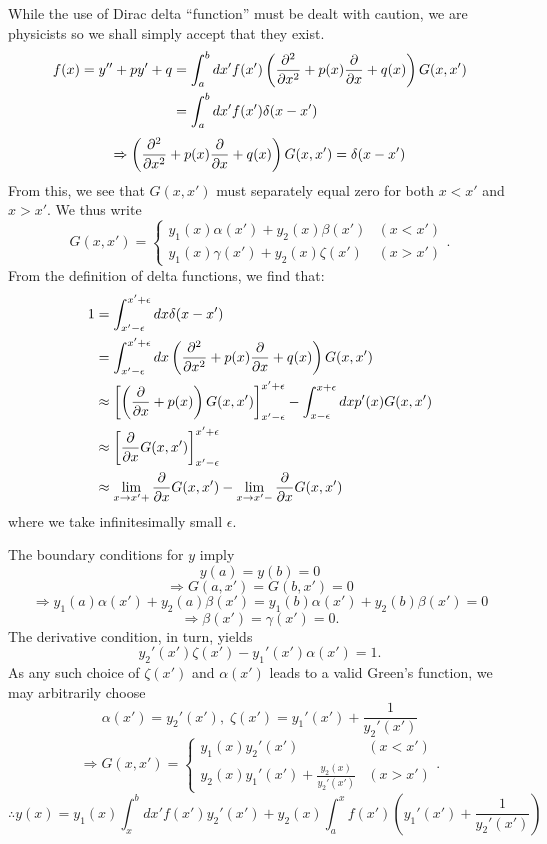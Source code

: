 \item
While the use of Dirac delta ``function'' must be dealt with caution,
we are physicists so we shall simply accept that they exist.
\begin{align*}
	f(x)
	= y'' + py' + q
	&= \int_a^b dx' f(x') \left( \frac{\partial^2}{\partial{}x^2} + p(x) \frac{\partial}{\partial{}x} + q(x) \right) G(x, x') \\
	&= \int_a^b dx' f(x') \delta(x - x')
\end{align*}
\[
	\Rightarrow \left( \frac{\partial^2}{\partial{}x^2} + p(x) \frac{\partial}{\partial{}x} + q(x) \right) G(x, x') = \delta(x - x')
\]
From this, we see that $G(x, x')$ must separately equal zero for both $x < x'$ and $x > x'$.
We thus write
\[
	G(x, x') =
	\begin{cases}
		y_1(x) \alpha(x') + y_2(x) \beta(x') & (x < x') \\
		y_1(x) \gamma(x') + y_2(x) \zeta(x') & (x > x')
	\end{cases}.
\]
From the definition of delta functions, we find that:
\begin{align*}
	1
	&= \int_{x' - \epsilon}^{x' + \epsilon} dx \delta(x - x') \\
	&= \int_{x' - \epsilon}^{x' + \epsilon} dx \left( \frac{\partial^2}{\partial{}x^2} + p(x) \frac{\partial}{\partial{}x} + q(x) \right) G(x, x') \\
	&\approx {\left[ \left( \frac{\partial}{\partial{}x} + p(x) \right) G(x, x') \right]}_{x' - \epsilon}^{x' + \epsilon}
		     - \int_{x - \epsilon}^{x + \epsilon} dx p'(x) G(x, x') \\
	&\approx {\left[ \frac{\partial}{\partial{}x} G(x, x') \right]}_{x' - \epsilon}^{x' + \epsilon} \\
	&\approx \lim_{x \rightarrow x'+} \frac{\partial}{\partial{}x} G(x, x') - \lim_{x \rightarrow x'-} \frac{\partial}{\partial{}x} G(x, x')
\end{align*}
where we take infinitesimally small $\epsilon$.

The boundary conditions for $y$ imply
\[
	y(a) = y(b) = 0
\]
\[
	\Rightarrow G(a, x') = G(b, x') = 0
\]
\[
	\Rightarrow y_1(a)\alpha(x') + y_2(a)\beta(x') = y_1(b)\alpha(x') + y_2(b)\beta(x') = 0
\]
\[
	\Rightarrow \beta(x') = \gamma(x') = 0.
\]
The derivative condition, in turn, yields
\[
	y_2'(x')\zeta(x') - y_1'(x')\alpha(x') = 1.
\]
As any such choice of $\zeta(x')$ and $\alpha(x')$ leads to a valid Green's function,
we may arbitrarily choose
\[
	\alpha(x') = y_2'(x'),\; \zeta(x') = y_1'(x') + \frac{1}{y_2'(x')}
\]
\[
	\Rightarrow G(x, x') =
	\begin{cases}
		y_1(x)y_2'(x') & (x < x') \\
		y_2(x)y_1'(x') + \frac{y_2(x)}{y_2'(x')} & (x > x')
	\end{cases}.
\]
\[
	\therefore y(x)
	= y_1(x) \int_x^b dx' f(x') y_2'(x') + y_2(x) \int_a^x f(x') \left( y_1'(x') + \frac{1}{y_2'(x')} \right)
\]

